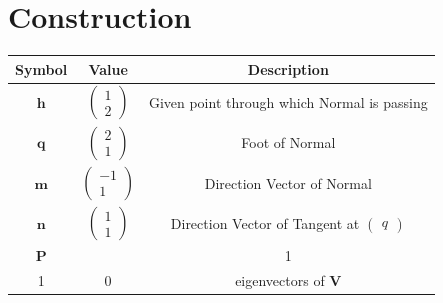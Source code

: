 \documentclass[journal,10pt,twocolumn]{article}
\let\vec\mathbf
\newcommand{\myvec}[1]{\ensuremath{\begin{pmatrix}#1\end{pmatrix}}}
\begin{document}
\section*{\large Construction}
{
\setlength\extrarowheight{5pt}
\begin{tabular}{|c|c|c|}
	\hline
	\textbf{Symbol}&\textbf{Value}&\textbf{Description}\\[5pt]
	\hline
	$\vec{h}$&$\myvec{1 \\ 2}$&Given point through which Normal is passing\\[5pt]
	\hline
	$\vec{q}$&$\myvec{2 \\ 1}$&Foot of Normal\\[5pt]
	\hline
	$\vec{m}$ & $\myvec{-1 \\ 1}$ & Direction Vector of Normal\\[5pt]
	\hline
	$\vec{n}$ & $\myvec{1 \\ 1}$ & Direction Vector of Tangent at $\myvec{q}$\\
	\hline
	$\vec{P}$&\myvec{0&1\\1&0}&eigenvectors of $\vec{V}$\\[5pt]
	\hline
\end{tabular}
}
\end{document}
